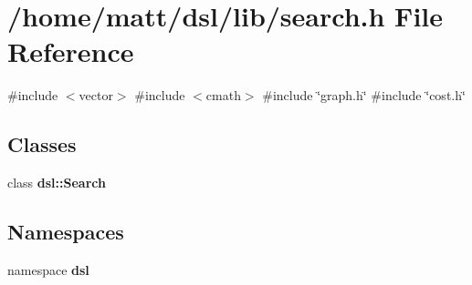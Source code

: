 \section{/home/matt/dsl/lib/search.h \-File \-Reference}
\label{search_8h}
{\ttfamily \#include $<$vector$>$}\*
{\ttfamily \#include $<$cmath$>$}\*
{\ttfamily \#include \char`\"{}graph.\-h\char`\"{}}\*
{\ttfamily \#include \char`\"{}cost.\-h\char`\"{}}\*
\subsection*{\-Classes}
\begin{DoxyCompactItemize}
\item 
class {\bf dsl\-::\-Search}
\end{DoxyCompactItemize}
\subsection*{\-Namespaces}
\begin{DoxyCompactItemize}
\item 
namespace {\bf dsl}
\end{DoxyCompactItemize}
